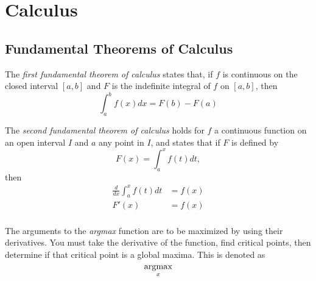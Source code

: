 \section{Calculus} \label{app:Calculus}
	\subsection{Fundamental Theorems of Calculus} \label{subsec:Fundamental Theorem of Calculus}
		\begin{definition} \label{def:1st Fundamental Theorem of Calculus}
			The \emph{first fundamental theorem of calculus} states that, if $f$ is continuous on the closed interval $\left[ a,b \right]$ and $F$ is the indefinite integral of $f$ on $\left[ a,b \right]$, then 
			\begin{equation} \label{eq:1st Fundamental Theorem of Calculus}
				\int_{a}^{b}f \left( x \right) dx = F \left( b \right) - F \left( a \right)
			\end{equation}
		\end{definition}
		\begin{definition} \label{def:2nd Fundamental Theorem of Calculus}
			The \emph{second fundamental theorem of calculus} holds for $f$ a continuous function on an open interval $I$ and $a$ any point in $I$, and states that if $F$ is defined by
			\begin{equation*}
				F \left( x \right) = \int_{a}^{x} f \left( t \right) dt,
			\end{equation*}
			then
			\begin{equation} \label{eq:2nd Fundamental Theorem of Calculus}
				\begin{aligned}
					\frac{d}{dx} \int_{a}^{x} f \left( t \right) dt &= f \left( x \right) \\
					F' \left( x \right) &= f \left( x \right) \\
				\end{aligned}
			\end{equation}
		\end{definition}
	
	\begin{definition}[argmax] \label{def:argmax}
		The arguments to the \emph{argmax} function are to be maximized by using their derivatives.
		You must take the derivative of the function, find critical points, then determine if that critical point is a global maxima.
		This is denoted as
		\begin{equation*} \label{eq:argmax}
			\operatorname*{argmax}_{x}
		\end{equation*}
	\end{definition}